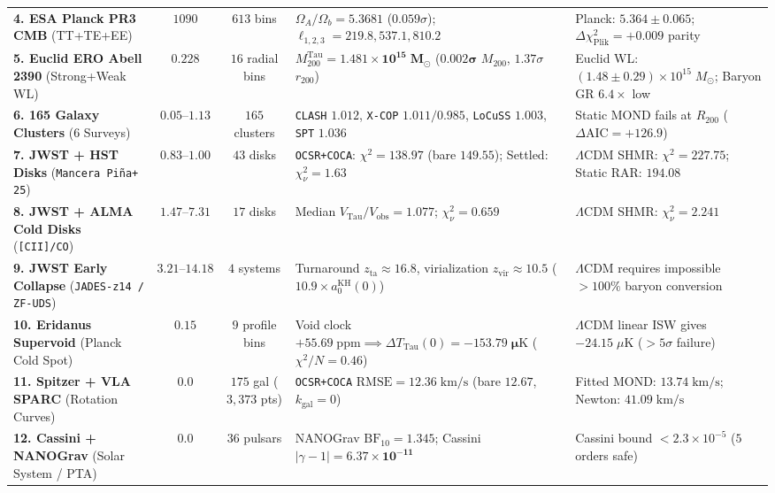 \documentclass[11pt,a4paper]{article}
\begin{document}
\begin{table}[H]
{\begin{tabular}{L{3.6cm}ccL{4.5cm}L{3.9cm}}
\addlinespace[2pt]
\textbf{4. ESA Planck PR3 CMB} (TT+TE+EE) & $1090$ & $613$ bins & $\Omega_A/\Omega_b = \mathbf{5.3681}$ ($0.059\sigma$); $\ell_{1,2,3} = 219.8, 537.1, 810.2$ & Planck: $5.364 \pm 0.065$; $\Delta\chi^2_{\mathrm{Plik}} = \mathbf{+0.009}$ parity \\
\addlinespace[2pt]
\textbf{5. Euclid ERO Abell 2390} (Strong+Weak WL) & $0.228$ & $16$ radial bins & $M_{200}^{\mathrm{Tau}} = \mathbf{1.481 \times 10^{15}\;M_\odot}$ ($\mathbf{0.002\sigma}$ $M_{200}$, $1.37\sigma$ $r_{200}$) & Euclid WL: $(1.48 \pm 0.29)\times 10^{15}\;M_\odot$; Baryon GR $6.4\times$ low \\
\addlinespace[2pt]
\textbf{6. 165 Galaxy Clusters} ($6$ Surveys) & $0.05\text{--}1.13$ & $165$ clusters & \texttt{CLASH} $1.012$, \texttt{X-COP} $1.011/0.985$, \texttt{LoCuSS} $1.003$, \texttt{SPT} $1.036$ & Static MOND fails at $R_{200}$ ($\Delta\mathrm{AIC} = +126.9$) \\
\addlinespace[2pt]
\textbf{7. JWST + HST Disks} (\texttt{Mancera Pi\~na+ 25}) & $0.83\text{--}1.00$ & $43$ disks & \texttt{OCSR+COCA}: $\chi^2 = \mathbf{138.97}$ (bare $149.55$); Settled: $\chi^2_\nu = \mathbf{1.63}$ & $\Lambda$CDM SHMR: $\chi^2 = \mathbf{227.75}$; Static RAR: $194.08$ \\
\addlinespace[2pt]
\textbf{8. JWST + ALMA Cold Disks} (\texttt{[CII]/CO}) & $1.47\text{--}7.31$ & $17$ disks & Median $V_{\mathrm{Tau}}/V_{\mathrm{obs}} = \mathbf{1.077}$; $\chi^2_\nu = \mathbf{0.659}$ & $\Lambda$CDM SHMR: $\chi^2_\nu = \mathbf{2.241}$ \\
\addlinespace[2pt]
\textbf{9. JWST Early Collapse} (\texttt{JADES-z14 / ZF-UDS}) & $3.21\text{--}14.18$ & $4$ systems & Turnaround $z_{\mathrm{ta}} \approx 16.8$, virialization $z_{\mathrm{vir}} \approx \mathbf{10.5}$ ($10.9\times a_0^{\mathrm{KH}}(0)$) & $\Lambda$CDM requires impossible $>100\%$ baryon conversion \\
\addlinespace[2pt]
\textbf{10. Eridanus Supervoid} (Planck Cold Spot) & $0.15$ & $9$ profile bins & Void clock $+55.69\;\mathrm{ppm} \implies \Delta T_{\mathrm{Tau}}(0) = \mathbf{-153.79\;\mu\mathrm{K}}$ ($\chi^2/N = \mathbf{0.46}$) & $\Lambda$CDM linear ISW gives $-24.15\;\mu\mathrm{K}$ ($>5\sigma$ failure) \\
\addlinespace[2pt]
\textbf{11. Spitzer + VLA SPARC} (Rotation Curves) & $0.0$ & $175$ gal ($3,373$ pts) & \texttt{OCSR+COCA} $\mathrm{RMSE} = \mathbf{12.36\;\mathrm{km/s}}$ (bare $12.67$, $k_{\mathrm{gal}} = 0$) & Fitted MOND: $13.74\;\mathrm{km/s}$; Newton: $41.09\;\mathrm{km/s}$ \\
\addlinespace[2pt]
\textbf{12. Cassini + NANOGrav} (Solar System / PTA) & $0.0$ & $36$ pulsars & NANOGrav $\mathrm{BF}_{10} = \mathbf{1.345}$; Cassini $|\gamma - 1| = \mathbf{6.37\times 10^{-11}}$ & Cassini bound $< 2.3\times 10^{-5}$ ($5$ orders safe) \\
\bottomrule
\end{tabular}%
}
\end{table}



\end{document}
